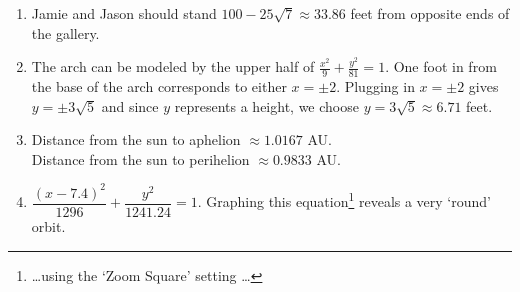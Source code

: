 \documentclass{ximera}
\begin{document}
\begin{enumerate}
\setcounter{enumi}{\value{HW}}

\item  Jamie and Jason should stand $100-25\sqrt{7} \approx 33.86$ feet from opposite ends of the gallery.

\item  The arch can be modeled by the upper half of $\frac{x^2}{9} + \frac{y^2}{81} = 1$.  One foot in from the base of the arch corresponds to either $x = \pm 2$.  Plugging in $x = \pm 2$ gives $y = \pm 3\sqrt{5}$ and since $y$ represents a height, we choose $y=3\sqrt{5} \approx 6.71$ feet. 

\item Distance from the sun to aphelion $\approx 1.0167$ AU.\\
Distance from the sun to perihelion $\approx 0.9833$ AU.

\item  $\dfrac{(x-7.4)^2}{1296} + \dfrac{y^2}{1241.24} = 1$.  Graphing this equation\footnote{\ldots using the `Zoom Square' setting \ldots} reveals a very `round' orbit.

\end{enumerate}
\end{document}
